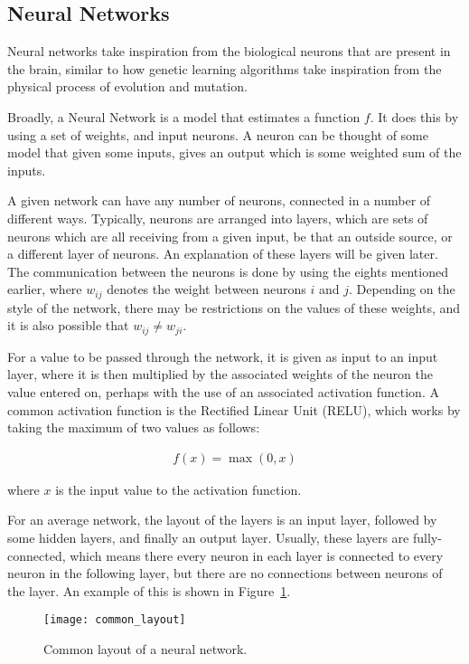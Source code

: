\subsection{Neural Networks}

Neural networks take inspiration from the biological neurons that
are present in the brain, similar to how genetic learning
algorithms take inspiration from the physical process of evolution
and mutation\cite{goldberg2006genetic}.

Broadly, a Neural Network is a model that estimates a function $f$.
It does this by using a set of weights, and input neurons. A neuron
can be thought of some model that given some inputs, gives
an output which is some weighted sum of the inputs.

A given network can have any number of neurons, connected in a number of
different ways. Typically, neurons are arranged into layers, which are sets of
neurons which are all receiving from a given input, be that an outside source,
or a different layer of neurons. An explanation of these layers will be given
later. The communication between the neurons is done by using the eights
mentioned earlier, where $w_{ij}$ denotes the weight between neurons $i$ and
$j$. Depending on the style of the network, there may be restrictions on the
values of these weights, and it is also possible that $w_{ij} \ne w_{ji}$.

For a value to be passed through the network, it is given as input to an input
layer, where it is then multiplied by the associated weights of the neuron the
value entered on, perhaps with the use of an associated activation function. A
common activation function is the Rectified Linear Unit
(RELU)\cite{Nair:2010:RLU:3104322.3104425}, which works by taking the maximum of
two values as follows:

\begin{align}
    f(x) = \max(0, x)
\end{align}

where $x$ is the input value to the activation function.

For an average network, the layout of the layers is an input layer,
followed by some hidden layers, and finally an output layer. Usually,
these layers are fully-connected, which means there every neuron in each
layer is connected to every neuron in the following layer, but
there are no connections between neurons of the layer. An example of this
is shown in Figure~\ref{fig:common_layout}.

\begin{figure}
    \centering
    \texttt{[image: common\_layout]}
    \caption{Common layout of a neural network.}%
    \label{fig:common_layout}
\end{figure}

